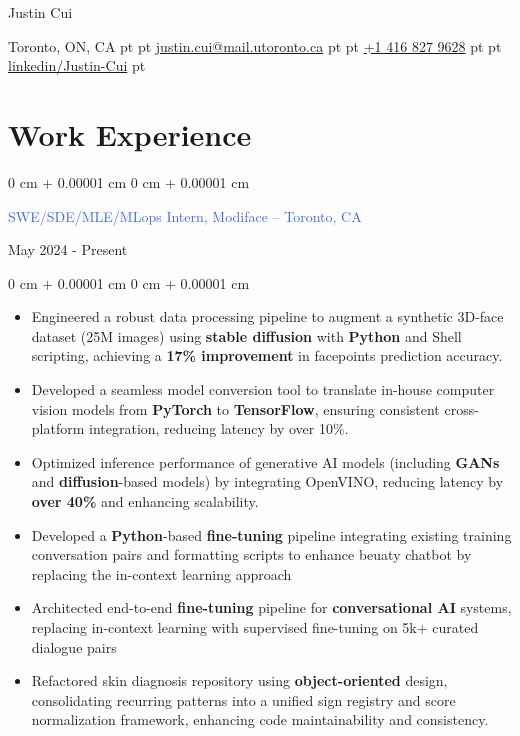 \documentclass[10pt, letterpaper]{article}
\newenvironment{highlights}{
    \begin{itemize}[
        topsep=0.10 cm,
        parsep=0.10 cm,
        partopsep=0pt,
        itemsep=0pt,
        leftmargin=0 cm + 10pt
    ]
}{
    \end{itemize}
}
\newenvironment{onecolentry}{
    \begin{adjustwidth}{
        0 cm + 0.00001 cm
    }{
        0 cm + 0.00001 cm
    }
}{
    \end{adjustwidth}
}
\newenvironment{twocolentry}[2][]{
    \onecolentry
    \def\secondColumn{#2}
    \setcolumnwidth{\fill, 4.5 cm}
    \begin{paracol}{2}
}{
    \switchcolumn \raggedleft \secondColumn
    \end{paracol}
    \endonecolentry
}
\newenvironment{header}{
    \setlength{\topsep}{0pt}\par\kern\topsep\centering\linespread{1.5}
}{
    \par\kern\topsep
}
\begin{document}
\begin{header}
    \fontsize{25 pt}{25 pt}\selectfont Justin Cui

    \vspace{1 pt}

    \normalsize
    Toronto, ON, CA%
     pt%
    \AND%
     pt%
    \href{mailto:justin.cui@mail.utoronto.ca}{justin.cui@mail.utoronto.ca}%
     pt%
    \AND%
     pt%
    \href{tel:+1-416-827-9628}{+1 416 827 9628}%
     pt%
    \AND%
     pt%
    \href{https://www.linkedin.com/in/justin-cui-b7b654181/}{linkedin/Justin-Cui}%
     pt%

\end{header}

\vspace{5 pt - 0.3 cm}

\section{Work Experience}
\vspace{0.10 cm}
\begin{twocolentry}{May 2024 - Present}
    {\textcolor{royalblue}{SWE/SDE/MLE/MLops Intern, Modiface -- Toronto, CA}}
\end{twocolentry}
\vspace{0.05 cm}
\begin{onecolentry}
    \begin{highlights}
        \item Engineered a robust data processing pipeline to augment a synthetic 3D-face dataset (25M images) using \textbf{ stable diffusion} with \textbf{Python} and Shell scripting, achieving a \textbf{17\% improvement }in facepoints prediction accuracy.
        \item Developed a seamless model conversion tool to translate in-house computer vision models from \textbf{PyTorch} to \textbf{TensorFlow}, ensuring consistent cross-platform integration, reducing latency by over 10\%.
        \item Optimized inference performance of generative AI models (including \textbf{GANs} and \textbf{diffusion}-based models) by integrating OpenVINO, reducing latency by \textbf{over 40\%} and enhancing scalability.
        \item Developed a \textbf{Python}-based\textbf{ fine-tuning} pipeline integrating existing training conversation pairs and formatting scripts to enhance beuaty chatbot by replacing the in-context learning approach
        \item Architected end-to-end\textbf{ fine-tuning }pipeline for \textbf{conversational AI }systems, replacing in-context learning with supervised fine-tuning on 5k+ curated dialogue pairs
        \item  Refactored skin diagnosis repository using \textbf{object-oriented} design, consolidating recurring patterns into a unified sign registry and score normalization framework, enhancing code maintainability and consistency.
    \end{highlights}
\end{onecolentry}
\end{document}
